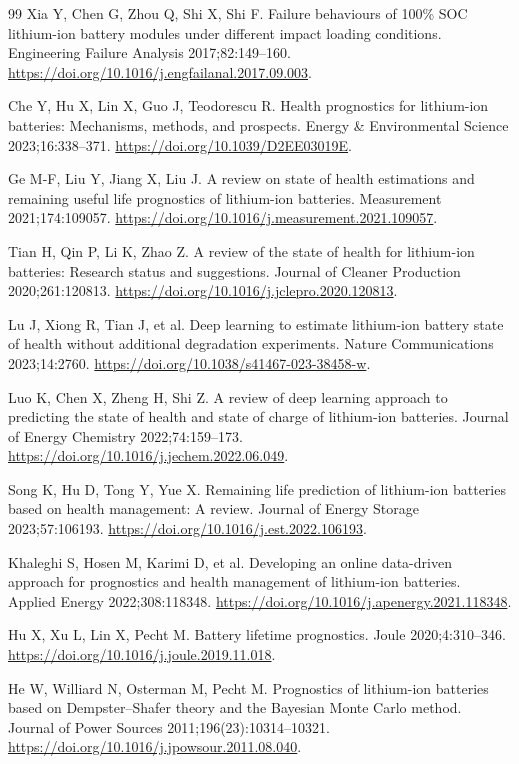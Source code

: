 \begin{thebibliography}{99}
 Xia Y, Chen G, Zhou Q, Shi X, Shi F. Failure behaviours of 100\% SOC lithium-ion battery modules under different impact loading conditions. Engineering Failure Analysis 2017;82:149–160. \url{https://doi.org/10.1016/j.engfailanal.2017.09.003}.

 Che Y, Hu X, Lin X, Guo J, Teodorescu R. Health prognostics for lithium-ion batteries: Mechanisms, methods, and prospects. Energy \& Environmental Science 2023;16:338–371. \url{https://doi.org/10.1039/D2EE03019E}.

 Ge M-F, Liu Y, Jiang X, Liu J. A review on state of health estimations and remaining useful life prognostics of lithium-ion batteries. Measurement 2021;174:109057. \url{https://doi.org/10.1016/j.measurement.2021.109057}.

 Tian H, Qin P, Li K, Zhao Z. A review of the state of health for lithium-ion batteries: Research status and suggestions. Journal of Cleaner Production 2020;261:120813. \url{https://doi.org/10.1016/j.jclepro.2020.120813}.

 Lu J, Xiong R, Tian J, et al. Deep learning to estimate lithium-ion battery state of health without additional degradation experiments. Nature Communications 2023;14:2760. \url{https://doi.org/10.1038/s41467-023-38458-w}.

 Luo K, Chen X, Zheng H, Shi Z. A review of deep learning approach to predicting the state of health and state of charge of lithium-ion batteries. Journal of Energy Chemistry 2022;74:159–173. \url{https://doi.org/10.1016/j.jechem.2022.06.049}.

 Song K, Hu D, Tong Y, Yue X. Remaining life prediction of lithium-ion batteries based on health management: A review. Journal of Energy Storage 2023;57:106193. \url{https://doi.org/10.1016/j.est.2022.106193}.

 Khaleghi S, Hosen M, Karimi D, et al. Developing an online data-driven approach for prognostics and health management of lithium-ion batteries. Applied Energy 2022;308:118348. \url{https://doi.org/10.1016/j.apenergy.2021.118348}.

 Hu X, Xu L, Lin X, Pecht M. Battery lifetime prognostics. Joule 2020;4:310–346. \url{https://doi.org/10.1016/j.joule.2019.11.018}.

 He W, Williard N, Osterman M, Pecht M. Prognostics of lithium-ion batteries based on Dempster–Shafer theory and the Bayesian Monte Carlo method. Journal of Power Sources 2011;196(23):10314–10321. \url{https://doi.org/10.1016/j.jpowsour.2011.08.040}.


\end{thebibliography}
